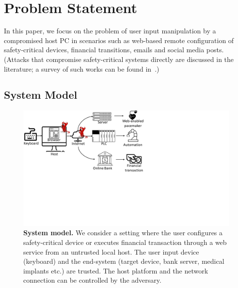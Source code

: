 \section{Problem Statement}
\label{sec:problemStatement}

In this paper, we focus on the problem of user input manipulation by a compromised host PC in scenarios such as web-based remote configuration of safety-critical devices, financial transitions, emails and social media posts. (Attacks that compromise safety-critical systems directly are discussed in the literature; a survey of such works can be found in~\cite{fachkha2017internet}.)



\subsection{System Model}

\begin{figure}[t]
    \centering
    \includegraphics[trim={0 8cm 14cm 0},clip,width=0.6\linewidth]{chapters/IntegriKey/images/Motivation_revised_5.pdf}
    \caption{\textbf{System model.} We consider a setting where the user configures a safety-critical device or executes financial transaction through a web service from an untrusted local host. The user input device (keyboard) and the end-system (target device, bank server, medical implants etc.) are trusted. The host platform and the network connection can be controlled by the adversary.} 
    \vspace{-10pt} 
    \label{fig:systemModel}
\end{figure}

